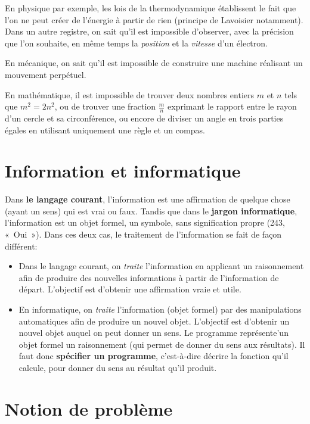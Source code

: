 En physique par exemple, les lois de la thermodynamique établissent le fait que l'on ne peut créer de l'énergie à partir de rien (principe de Lavoisier notamment). Dans un autre registre, on sait qu'il est impossible d'observer, avec la précision que l'on souhaite, en même temps la \textit{position} et la \textit{vitesse} d'un électron.

En mécanique, on sait qu'il est impossible de construire une machine réalisant un mouvement perpétuel.

En mathématique, il est impossible de trouver deux nombres entiers $m$ et $n$ tels que $m^2 = 2n^2$, ou de trouver une fraction $\frac{m}{n}$ exprimant le rapport entre le rayon d'un cercle et sa circonférence, ou encore de diviser un angle en trois parties égales en utilisant uniquement une règle et un compas.

\section{Information et informatique}
\label{sec:information_informatique}

Dans \textbf{le langage courant}, l’information est une affirmation de quelque chose (ayant un sens) qui est vrai ou faux. Tandis que dans le \textbf{jargon informatique}, l’information est un objet formel, un symbole, sans signification propre (243, « Oui »).
Dans ces deux cas, le traitement de l'information se fait de façon différent:
\begin{itemize}
	\item Dans le langage courant, on \textit{traite} l'information en applicant un raisonnement afin de produire des nouvelles informations à partir de l'information de départ. L'objectif est d'obtenir une affirmation vraie et utile.
	\item En informatique, on \textit{traite} l’information (objet formel) par des manipulations automatiques afin de produire un nouvel objet. L’objectif est d’obtenir un nouvel objet auquel on peut donner un sens. Le programme représente’un objet formel  un raisonnement (qui permet de donner du sens aux résultats). Il faut donc \textbf{spécifier un programme}, c'est-à-dire décrire la fonction qu’il calcule, pour donner du sens au résultat qu’il produit.
\end{itemize}

\section{Notion de problème}
\label{sec:notion_de_probleme}

